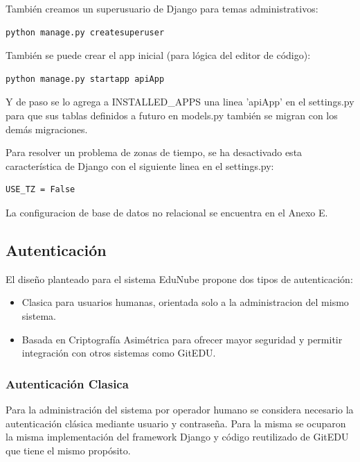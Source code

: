 También creamos un superusuario de Django para temas administrativos:
\begin{lstlisting}
python manage.py createsuperuser
\end{lstlisting}

También se puede crear el app inicial (para lógica del editor de código):
\begin{lstlisting}
python manage.py startapp apiApp
\end{lstlisting}

Y de paso se lo agrega a INSTALLED\_APPS una linea 'apiApp' en el settings.py para que sus tablas definidos a futuro en models.py también se migran con los demás migraciones.

Para resolver un problema de zonas de tiempo, se ha desactivado esta característica de Django con el siguiente linea en el settings.py:
\lstset{language=Python}
\begin{lstlisting}
USE_TZ = False
\end{lstlisting}
\lstset{language=Bash}

La configuracion de base de datos no relacional se encuentra en el Anexo E.

\subsection{Autenticación}
El diseño planteado para el sistema EduNube propone dos tipos de autenticación:
\begin{itemize}
\item Clasica para usuarios humanas, orientada solo a la administracion del mismo sistema.
\item Basada en Criptografía Asimétrica para ofrecer mayor seguridad y permitir integración con otros sistemas como GitEDU.
\end{itemize}

\subsubsection{Autenticación Clasica}
Para la administración del sistema por operador humano se considera necesario la autenticación clásica mediante usuario y contraseña. Para la misma se ocuparon la misma implementación del framework Django y código reutilizado de GitEDU que tiene el mismo propósito.

